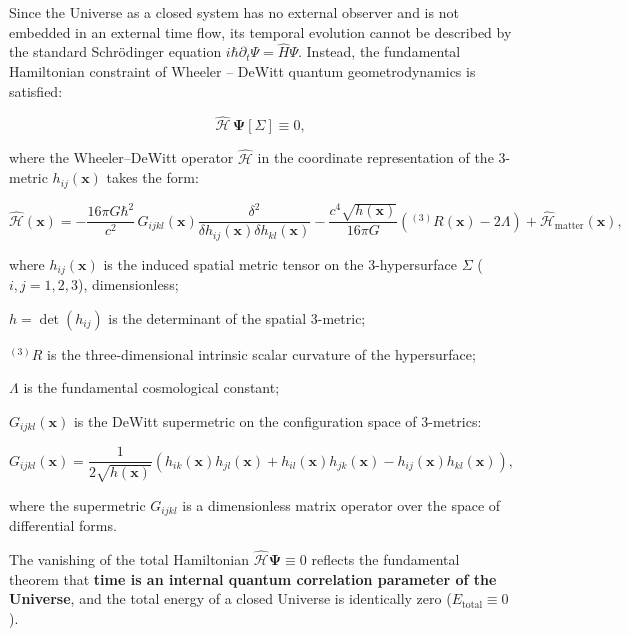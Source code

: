 \documentclass[11pt,a4paper]{article}
\theoremstyle{definition}
\begin{document}
Since the Universe as a closed system has no external observer and is not embedded in an external time flow, its temporal evolution cannot be described by the standard Schr\"odinger equation $i\hbar \partial_t \Psi = \hat{H}\Psi$. Instead, the fundamental Hamiltonian constraint of Wheeler \cite{ref5} -- DeWitt \cite{ref6} quantum geometrodynamics is satisfied:

\begin{equation}\label{eq:1.30}\tag{1.30}
\hat{\mathcal{H}} \, \mathbf{\Psi}[\Sigma] \equiv 0,
\end{equation}

where the Wheeler--DeWitt operator $\hat{\mathcal{H}}$ in the coordinate representation of the 3-metric $h_{ij}(\mathbf{x})$ takes the form:

\begin{equation}\label{eq:1.31}\tag{1.31}
\hat{\mathcal{H}}(\mathbf{x}) = -\frac{16\pi G \hbar^2}{c^2} \, G_{ijkl}(\mathbf{x}) \frac{\delta^2}{\delta h_{ij}(\mathbf{x}) \delta h_{kl}(\mathbf{x})} - \frac{c^4 \sqrt{h(\mathbf{x})}}{16\pi G} \left( {}^{(3)}R(\mathbf{x}) - 2\Lambda \right) + \hat{\mathcal{H}}_{\text{matter}}(\mathbf{x}),
\end{equation}

where $h_{ij}(\mathbf{x})$ is the induced spatial metric tensor on the 3-hypersurface $\Sigma$ ($i, j = 1, 2, 3$), dimensionless;  

$h = \det(h_{ij})$ is the determinant of the spatial 3-metric;  

${}^{(3)}R$ is the three-dimensional intrinsic scalar curvature of the hypersurface;  

$\Lambda$ is the fundamental cosmological constant;  

$G_{ijkl}(\mathbf{x})$ is the DeWitt supermetric on the configuration space of 3-metrics:

\begin{equation}\label{eq:1.32}\tag{1.32}
G_{ijkl}(\mathbf{x}) = \frac{1}{2\sqrt{h(\mathbf{x})}} \left( h_{ik}(\mathbf{x}) h_{jl}(\mathbf{x}) + h_{il}(\mathbf{x}) h_{jk}(\mathbf{x}) - h_{ij}(\mathbf{x}) h_{kl}(\mathbf{x}) \right),
\end{equation}

where the supermetric $G_{ijkl}$ is a dimensionless matrix operator over the space of differential forms.

The vanishing of the total Hamiltonian $\hat{\mathcal{H}}\mathbf{\Psi} \equiv 0$ reflects the fundamental theorem that \textbf{time is an internal quantum correlation parameter of the Universe}, and the total energy of a closed Universe is identically zero ($E_{\text{total}} \equiv 0$).
\end{document}
